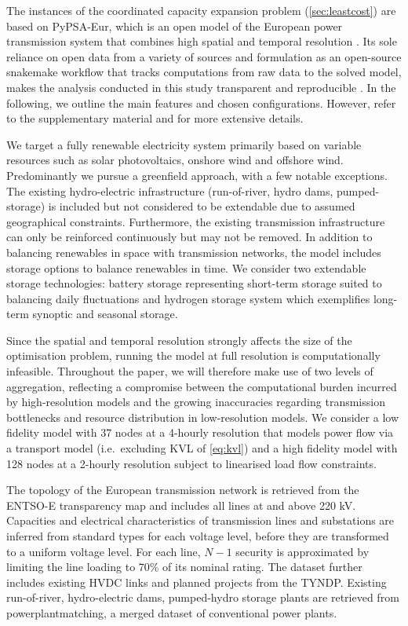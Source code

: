 
The instances of the coordinated capacity expansion problem (\cref{sec:leastcost})
 are based on \mbox{PyPSA-Eur},
which is an open model of the European power transmission system
that combines high spatial and temporal resolution \cite{pypsaeur}.
Its sole reliance on open data from a variety of sources
and formulation as an open-source snakemake workflow
that tracks computations from raw data to the solved model,
makes the analysis conducted in this study transparent and reproducible \cite{snakemake}.
In the following, we outline the main features and chosen configurations. 
However, refer to the supplementary material and \cite{pypsaeur} for more extensive details.

We target a fully renewable electricity system primarily based on variable resources
such as solar photovoltaics, onshore wind and offshore wind.
Predominantly we pursue a greenfield approach, with a few notable exceptions.
The existing hydro-electric infrastructure (run-of-river, hydro dams, pumped-storage)
is included but not considered to be extendable due to assumed geographical constraints.
Furthermore, the existing transmission infrastructure can only
be reinforced continuously but may not be removed.
In addition to balancing renewables in space with transmission networks,
the model includes storage options to balance renewables in time.
We consider two extendable storage technologies:
battery storage representing short-term storage suited to balancing daily fluctuations and
hydrogen storage system which exemplifies long-term synoptic and seasonal storage.

Since the spatial and temporal resolution strongly affects the size of the optimisation problem,
running the model at full resolution is computationally infeasible.
Throughout the paper, we will therefore make use of two levels of aggregation,
reflecting a compromise between the computational burden incurred by high-resolution models and
the growing inaccuracies regarding transmission bottlenecks
and resource distribution in low-resolution models.
We consider a low fidelity model with 37 nodes at a 4-hourly resolution
that models power flow via a transport model (i.e.~excluding KVL of \cref{eq:kvl}) and
a high fidelity model with 128 nodes at a 2-hourly resolution
subject to linearised load flow constraints.


The topology of the European transmission network is retrieved
from the ENTSO-E transparency map and includes all lines at and above 220 kV.
Capacities and electrical characteristics of transmission lines and substations are
inferred from standard types for each voltage level, before they are transformed to
a uniform voltage level.
For each line, $N-1$ security is approximated by limiting the line loading to 70\% of its nominal rating.
The dataset further includes existing HVDC links and planned projects from the TYNDP.
Existing run-of-river, hydro-electric dams, pumped-hydro storage plants
are retrieved from powerplantmatching, a merged dataset of conventional power plants.

